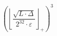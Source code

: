 \[\left(\left\lfloor \frac{\sqrt{L \cdot \Delta}}{2^{32} \cdot \varepsilon} \right\rfloor_{+}\right)^{3}\]
